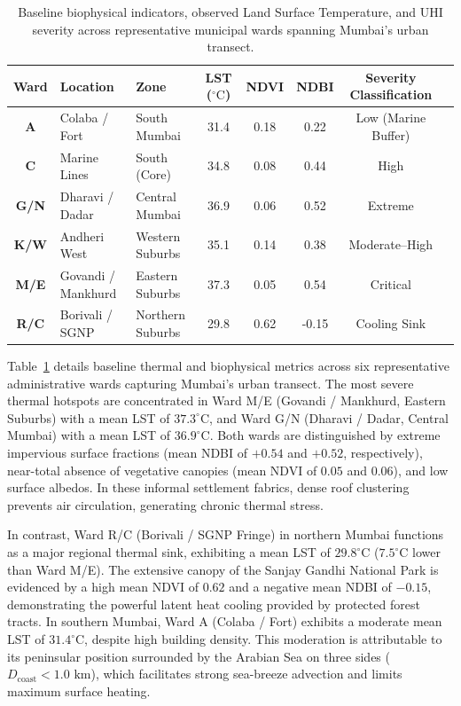 \documentclass[a4paper,fleqn]{cas-sc}
\begin{document}
\begin{table}
\caption{Baseline biophysical indicators, observed Land Surface Temperature, and UHI severity across representative municipal wards spanning Mumbai's urban transect.}
\label{tab:wards_baseline}
\footnotesize
\begin{tabular*}{\linewidth}{@{\extracolsep{\fill}}cllccccl@{}}
\toprule
Ward & Location & Zone & LST ($^\circ\text{C}$) & NDVI & NDBI & Severity Classification \\
\midrule
\textbf{A} & Colaba / Fort & South Mumbai & 31.4 & 0.18 & 0.22 & Low (Marine Buffer) \\
\textbf{C} & Marine Lines & South (Core) & 34.8 & 0.08 & 0.44 & High \\
\textbf{G/N} & Dharavi / Dadar & Central Mumbai & 36.9 & 0.06 & 0.52 & Extreme \\
\textbf{K/W} & Andheri West & Western Suburbs & 35.1 & 0.14 & 0.38 & Moderate--High \\
\textbf{M/E} & Govandi / Mankhurd & Eastern Suburbs & 37.3 & 0.05 & 0.54 & Critical \\
\textbf{R/C} & Borivali / SGNP & Northern Suburbs & 29.8 & 0.62 & -0.15 & Cooling Sink \\
\bottomrule
\end{tabular*}
\end{table}

Table~\ref{tab:wards_baseline} details baseline thermal and biophysical metrics across six representative administrative wards capturing Mumbai's urban transect. The most severe thermal hotspots are concentrated in Ward M/E (Govandi / Mankhurd, Eastern Suburbs) with a mean LST of $37.3^\circ\text{C}$, and Ward G/N (Dharavi / Dadar, Central Mumbai) with a mean LST of $36.9^\circ\text{C}$. Both wards are distinguished by extreme impervious surface fractions (mean NDBI of $+0.54$ and $+0.52$, respectively), near-total absence of vegetative canopies (mean NDVI of $0.05$ and $0.06$), and low surface albedos. In these informal settlement fabrics, dense roof clustering prevents air circulation, generating chronic thermal stress.

In contrast, Ward R/C (Borivali / SGNP Fringe) in northern Mumbai functions as a major regional thermal sink, exhibiting a mean LST of $29.8^\circ\text{C}$ ($7.5^\circ\text{C}$ lower than Ward M/E). The extensive canopy of the Sanjay Gandhi National Park is evidenced by a high mean NDVI of $0.62$ and a negative mean NDBI of $-0.15$, demonstrating the powerful latent heat cooling provided by protected forest tracts. In southern Mumbai, Ward A (Colaba / Fort) exhibits a moderate mean LST of $31.4^\circ\text{C}$, despite high building density. This moderation is attributable to its peninsular position surrounded by the Arabian Sea on three sides ($D_{\text{coast}} < 1.0\text{ km}$), which facilitates strong sea-breeze advection and limits maximum surface heating.
\end{document}
